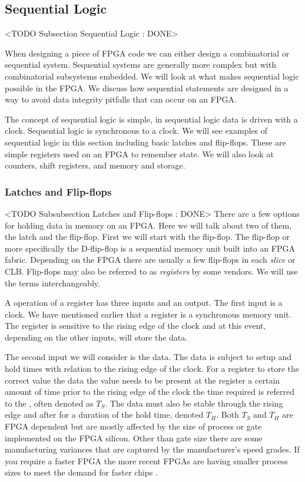 \subsection{Sequential Logic}
	<TODO Subsection Sequential Logic : DONE>
	
When designing a piece of \ac{FPGA} code we can either design a combinatorial or sequential system. Sequential systems are generally more complex but with combinatorial subsystems embedded. We will look at what makes sequential logic possible in the \ac{FPGA}. We discuss how sequential statements are designed in a way to avoid data integrity pitfalls that can occur on an \ac{FPGA}.
	
The concept of sequential logic is simple, in sequential logic data is driven with a clock. Sequential logic is synchronous to a clock. We will see examples of sequential logic in this section including basic latches and flip-flops. These are simple registers used on an \ac{FPGA} to remember state. We will also look at counters, shift registers, and memory and storage. 	
	
	
\subsubsection{Latches and Flip-flops}
	<TODO Subsubsection  Latches and Flip-flops : DONE>
\label{sec:regs}
There are a few options for holding data in memory on an \ac{FPGA}. Here we will talk about two of them, the latch and the flip-flop. First we will start with the flip-flop. The flip-flop or more specifically the D-flip-flop is a sequential memory unit built into an \ac{FPGA} fabric. Depending on the \ac{FPGA} there are usually a few flip-flops in each \emph{slice} or \ac{CLB}. Flip-flops may also be referred to as \emph{registers} by some vendors. We will use the terms interchangeably. 

A operation of a register has three inputs and an output. The first input is a clock. We have mentioned earlier that a register is a synchronous memory unit. The register is sensitive to the rising edge of the clock and at this event, depending on the other inputs, will store the data. 

The second input we will consider is the data. The data is subject to setup and hold times with relation to the rising edge of the clock. For a register to store the correct value the data the value needs to be present at the register a certain amount of time prior to the rising edge of the clock the time required is referred to the \emph{}, often denoted as $T_S$. The data must also be stable through the rising edge and after for a duration of the hold time, denoted $T_H$. Both $T_S$ and $T_H$ are \ac{FPGA} dependent but are mostly affected by the size of process or gate implemented on the \ac{FPGA} silicon. Other than gate size there are some manufacturing variances that are captured by the manufacturer's speed grades. If you require a faster \ac{FPGA} the more recent \ac{FPGA}s are having smaller process sizes to meet the demand for faster chips \cite{7nmref}. 

